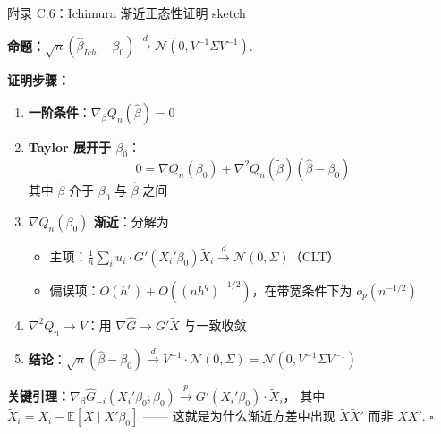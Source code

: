 \documentclass[aspectratio=169, 10pt]{beamer}
\begin{document}
\begin{frame}{附录 C.6：Ichimura 渐近正态性证明 sketch}
  \hypertarget{proof-c6}{}

  \textbf{命题：}$\sqrt{n}(\hat\beta_{Ich} - \beta_0) \overset{d}{\to} \mathcal{N}(0, V^{-1}\Sigma V^{-1})$.

  \textbf{证明步骤：}
  \begin{enumerate}\setlength{\itemsep}{1pt}
    \item \textbf{一阶条件}：$\nabla_\beta Q_n(\hat\beta) = 0$
    \item \textbf{Taylor 展开于 $\beta_0$}：
    $$0 = \nabla Q_n(\beta_0) + \nabla^2 Q_n(\tilde\beta) (\hat\beta - \beta_0)$$
    其中 $\tilde\beta$ 介于 $\beta_0$ 与 $\hat\beta$ 之间
    \item \textbf{$\nabla Q_n(\beta_0)$ 渐近}：分解为
    \begin{itemize}\setlength{\itemsep}{1pt}
      \item 主项：$\frac{1}{n}\sum_i u_i \cdot G'(X_i'\beta_0) \tilde X_i \overset{d}{\to} \mathcal{N}(0, \Sigma)$（CLT）
      \item 偏误项：$O(h^r) + O((nh^q)^{-1/2})$，在带宽条件下为 $o_p(n^{-1/2})$
    \end{itemize}
    \item \textbf{$\nabla^2 Q_n \to V$}：用 $\nabla \hat G \to G' \tilde X$ 与一致收敛
    \item \textbf{结论}：$\sqrt{n}(\hat\beta - \beta_0) \overset{d}{\to} V^{-1} \cdot \mathcal{N}(0, \Sigma) = \mathcal{N}(0, V^{-1}\Sigma V^{-1})$
  \end{enumerate}

  \textbf{关键引理：}$\nabla_\beta \hat G_{-i}(X_i'\beta_0; \beta_0) \overset{p}{\to} G'(X_i'\beta_0) \cdot \tilde X_i$，
  其中 $\tilde X_i = X_i - \mathbb{E}[X \mid X'\beta_0]$ —— 这就是为什么渐近方差中出现 $\tilde X \tilde X'$ 而非 $X X'$.
  $\square$
  \hfill{\scriptsize\hyperlink{main-c6}{}}

\end{frame}
\end{document}
